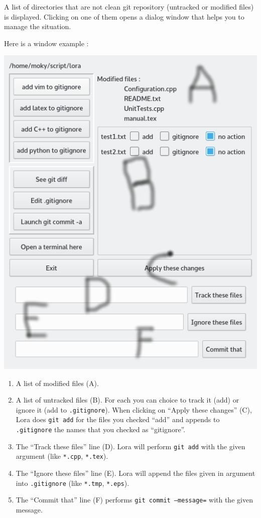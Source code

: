 \documentclass[a4paper,12pt]{article}
\newcommand{\info}[1]{\texttt{#1}}
\begin{document}
A list of directories that are not clean git repository (untracked or modified files) is displayed. Clicking on one of them opens a dialog window that helps you to manage the situation.

Here is a window example :

\begin{center}
    \includegraphics[width=\linewidth]{git_helper.png}
\end{center}

\begin{enumerate}
    \item
        A list of modified files (A).
    \item
        A list of untracked files (B). For each you can choice to track it (add) or ignore it (add to \info{.gitignore}). When clicking on ``Apply these changes'' (C), Lora does \info{git add} for the files you checked ``add'' and appends to \info{.gitignore} the names that you checked as ``gitignore''.
    \item
        The ``Track these files'' line (D). Lora will perform \info{git add} with the given argument (like \info{*.cpp}, \info{*.tex}).
    \item
        The ``Ignore these files'' line (E). Lora will append the files given in argument into \info{.gitignore} (like \info{*.tmp}, \info{*.eps}).
    \item
        The ``Commit that'' line (F) performs \info{git commit --message=} with the given message.
\end{enumerate}
\end{document}
